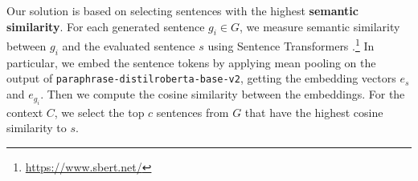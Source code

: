Our solution is based on selecting sentences with the highest \textbf{semantic similarity}. For each generated sentence $g_i\in G$, we measure semantic similarity between $g_i$ and the evaluated sentence $s$ using Sentence Transformers \cite{reimers-2019-sentence-bert}.\footnote{\url{https://www.sbert.net/}}
In particular, we embed the sentence tokens by applying mean pooling on the output of \texttt{paraphrase-distilroberta-base-v2}, getting the embedding vectors $e_{s}$ and $e_{g_i}$. %
Then we compute the cosine similarity between the embeddings.
For the context $C$, we select the top $c$ sentences from $G$ that have the highest cosine similarity to $s$.


